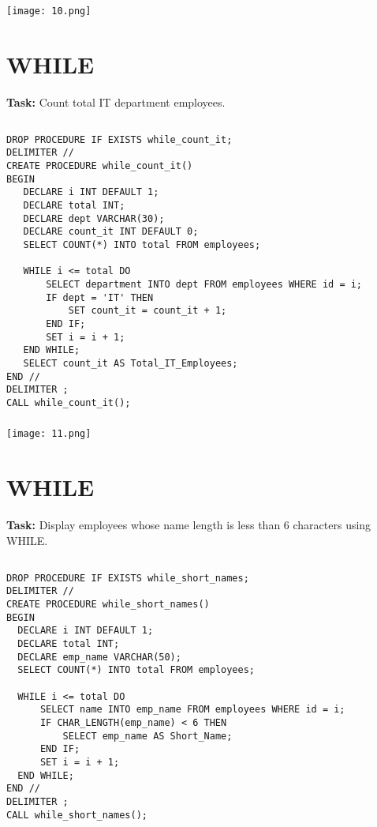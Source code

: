 \documentclass[12pt,a4paper]{article}
\begin{document}
\subsubsection{}
\begin{center}
    \texttt{[image: 10.png]}
\end{center}


\section{WHILE}
\textbf{Task:} Count total IT department employees.

\subsection{}
\begin{lstlisting}
DROP PROCEDURE IF EXISTS while_count_it;
DELIMITER //
CREATE PROCEDURE while_count_it()
BEGIN
   DECLARE i INT DEFAULT 1;
   DECLARE total INT;
   DECLARE dept VARCHAR(30);
   DECLARE count_it INT DEFAULT 0;
   SELECT COUNT(*) INTO total FROM employees;

   WHILE i <= total DO
       SELECT department INTO dept FROM employees WHERE id = i;
       IF dept = 'IT' THEN
           SET count_it = count_it + 1;
       END IF;
       SET i = i + 1;
   END WHILE;
   SELECT count_it AS Total_IT_Employees;
END //
DELIMITER ;
CALL while_count_it();

\end{lstlisting}

\subsubsection{}
\begin{center}
    \texttt{[image: 11.png]}
\end{center}


\section{WHILE}
\textbf{Task:} Display employees whose name length is less than 6 characters using WHILE.

\subsection{}
\begin{lstlisting}
DROP PROCEDURE IF EXISTS while_short_names;
DELIMITER //
CREATE PROCEDURE while_short_names()
BEGIN
  DECLARE i INT DEFAULT 1;
  DECLARE total INT;
  DECLARE emp_name VARCHAR(50);
  SELECT COUNT(*) INTO total FROM employees;

  WHILE i <= total DO
      SELECT name INTO emp_name FROM employees WHERE id = i;
      IF CHAR_LENGTH(emp_name) < 6 THEN
          SELECT emp_name AS Short_Name;
      END IF;
      SET i = i + 1;
  END WHILE;
END //
DELIMITER ;
CALL while_short_names();

\end{lstlisting}
\end{document}
